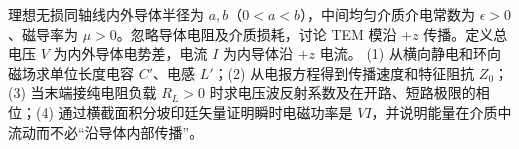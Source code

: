 理想无损同轴线内外导体半径为 \(a,b\)（\(0<a<b\)），中间均匀介质介电常数为 \(\epsilon>0\)、磁导率为 \(\mu>0\)。忽略导体电阻及介质损耗，讨论 TEM 模沿 \(+z\) 传播。定义总电压 \(V\) 为内外导体电势差，电流 \(I\) 为内导体沿 \(+z\) 电流。
(1) 从横向静电和环向磁场求单位长度电容 \(C'\)、电感 \(L'\)；(2) 从电报方程得到传播速度和特征阻抗 \(Z_0\)；(3) 当末端接纯电阻负载 \(R_L>0\) 时求电压波反射系数及在开路、短路极限的相位；(4) 通过横截面积分坡印廷矢量证明瞬时电磁功率是 \(VI\)，并说明能量在介质中流动而不必“沿导体内部传播”。
